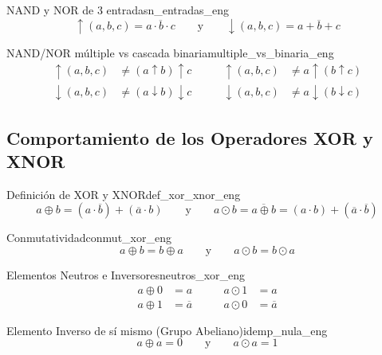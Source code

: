 \documentclass[12pt,a4paper]{article}
\begin{document}
\setcounter{tcb@cnt@definicion}{6}
\begin{definicion}{NAND y NOR de 3 entradas}{n_entradas_eng}
\[ \uparrow(a,b,c) = \overline{a \cdot b \cdot c} \qquad \text{y} \qquad \downarrow(a,b,c) = \overline{a + b + c} \]
\end{definicion}

\setcounter{tcb@cnt@teorema}{20}
\begin{teorema}{NAND/NOR múltiple vs cascada binaria}{multiple_vs_binaria_eng}
\begin{align*}
    \uparrow(a,b,c) &\neq (a \uparrow b) \uparrow c \qquad & \uparrow(a,b,c) &\neq a \uparrow (b \uparrow c) \\
    \downarrow(a,b,c) &\neq (a \downarrow b) \downarrow c \qquad & \downarrow(a,b,c) &\neq a \downarrow (b \downarrow c)
\end{align*}
\end{teorema}
\subsection*{Comportamiento de los Operadores XOR y XNOR}

\setcounter{tcb@cnt@definicion}{4}
\begin{definicion}{Definición de XOR y XNOR}{def_xor_xnor_eng}
\[ a \oplus b = (a \cdot \overline{b}) + (\overline{a} \cdot b) \qquad \text{y} \qquad a \odot b = \overline{a \oplus b} = (a \cdot b) + (\overline{a} \cdot \overline{b}) \]
\end{definicion}

\setcounter{tcb@cnt@teorema}{22}
\begin{teorema}{Conmutatividad}{conmut_xor_eng}
\[ a \oplus b = b \oplus a \qquad \text{y} \qquad a \odot b = b \odot a \]
\end{teorema}

\setcounter{tcb@cnt@teorema}{23}
\begin{teorema}{Elementos Neutros e Inversores}{neutros_xor_eng}
\begin{align*}
    a \oplus 0 &= a \qquad & a \odot 1 &= a \\
    a \oplus 1 &= \overline{a} \qquad & a \odot 0 &= \overline{a}
\end{align*}
\end{teorema}

\setcounter{tcb@cnt@teorema}{24}
\begin{teorema}{Elemento Inverso de sí mismo (Grupo Abeliano)}{idemp_nula_eng}
\[ a \oplus a = 0 \qquad \text{y} \qquad a \odot a = 1 \]
\end{teorema}
\end{document}
